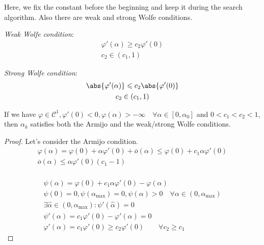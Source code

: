 Here, we fix the constant before the beginning and keep it during the search algorithm. Also there are weak and strong Wolfe conditions.
\begin{definition} \textit{Weak Wolfe condition}:
\begin{gather*}
  \varphi'(\alpha) \geqslant c_2 \varphi'(0) \\
  c_2 \in (c_1, 1)
\end{gather*}
\end{definition}

\begin{definition} \textit{Strong Wolfe condition}:
\begin{gather*}
  \abs{\varphi'(\alpha)} \leqslant c_2 \abs{\varphi'(0)} \\
  c_2 \in (c_1, 1)
\end{gather*}
\end{definition}

\begin{theorem}
  If we have $\varphi \in \mathcal{C}^1, \varphi'(0) < 0, \varphi(\alpha) > -\infty \quad \forall \alpha \in [0, \alpha_0]$ and $0 < c_1 < c_2 < 1$, then $\alpha_k$ satisfies both the Armijo and the weak/strong Wolfe conditions.
\end{theorem}
\begin{proof}
  Let's consider the Armijo condition. 
  \begin{gather*}
    \varphi(\alpha) = \varphi(0) + \alpha \varphi'(0) + \overline{o} (\alpha) \leqslant \varphi(0) + c_1 \alpha \varphi'(0) \\
    \overline{o}(\alpha) \leqslant \alpha \varphi'(0) (c_1 - 1) \\
  \end{gather*}

  \begin{gather*}
    \psi(\alpha) = \varphi(0) + c_1 \alpha \varphi'(0) - \varphi(\alpha) \\
    \psi(0) = 0, \psi(\alpha_{\max}) = 0, \psi(\alpha) > 0 \quad \forall \alpha \in (0, \alpha_{\max}) \\
    \exists \hat\alpha \in (0, \alpha_{\max}): \psi'(\hat\alpha) = 0 \\
    \psi'(\alpha) = c_1 \varphi'(0) - \varphi'(\alpha) = 0 \\
    \varphi'(\alpha) = c_1 \varphi'(0) \geqslant c_2 \varphi'(0) \qquad \forall c_2 \geqslant c_1
  \end{gather*}
\end{proof}

